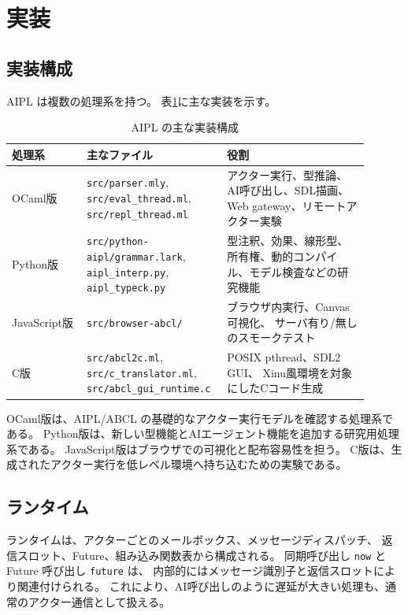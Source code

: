 \documentclass[11pt,a4paper,uplatex,dvipdfmx]{jsarticle}
\newcommand{\code}[1]{\texttt{#1}}
\begin{document}
\section{実装}

\subsection{実装構成}

AIPL は複数の処理系を持つ。
表\ref{tab:impl}に主な実装を示す。

\begin{longtable}{p{0.20\linewidth}p{0.32\linewidth}p{0.38\linewidth}}
\caption{AIPL の主な実装構成}
\label{tab:impl}\\
\toprule
処理系 & 主なファイル & 役割 \\
\midrule
OCaml版 & \code{src/parser.mly}, \code{src/eval\_thread.ml},
\code{src/repl\_thread.ml} & アクター実行、型推論、AI呼び出し、SDL描画、
Web gateway、リモートアクター実験 \\
Python版 & \code{src/python-aipl/grammar.lark},
\code{aipl\_interp.py}, \code{aipl\_typeck.py} &
型注釈、効果、線形型、所有権、動的コンパイル、モデル検査などの研究機能 \\
JavaScript版 & \code{src/browser-abcl/} & ブラウザ内実行、Canvas可視化、
サーバ有り/無しのスモークテスト \\
C版 & \code{src/abcl2c.ml}, \code{src/c\_translator.ml},
\code{src/abcl\_gui\_runtime.c} & POSIX pthread、SDL2 GUI、
Xinu風環境を対象にしたCコード生成 \\
\bottomrule
\end{longtable}

OCaml版は、AIPL/ABCL の基礎的なアクター実行モデルを確認する処理系である。
Python版は、新しい型機能とAIエージェント機能を追加する研究用処理系である。
JavaScript版はブラウザでの可視化と配布容易性を担う。
C版は、生成されたアクター実行を低レベル環境へ持ち込むための実験である。

\subsection{ランタイム}

ランタイムは、アクターごとのメールボックス、メッセージディスパッチ、
返信スロット、Future、組み込み関数表から構成される。
同期呼び出し \code{now} と Future 呼び出し \code{future} は、
内部的にはメッセージ識別子と返信スロットにより関連付けられる。
これにより、AI呼び出しのように遅延が大きい処理も、通常のアクター通信として扱える。
\end{document}
